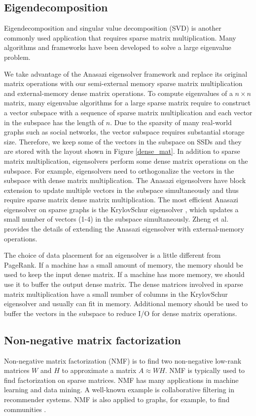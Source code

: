 \subsection{Eigendecomposition}
Eigendecomposition and singular value decomposition (SVD) is another commonly
used application that requires sparse matrix multiplication. Many
algorithms \cite{Lanczos, IRLM, krylovschur} and frameworks
\cite{arpack, anasazi, slepc} have been developed to solve a large eigenvalue
problem.

We take advantage of the Anasazi eigensolver framework \cite{anasazi} and
replace its original matrix operations with our semi-external memory sparse
matrix multiplication and external-memory dense matrix operations. To compute
eigenvalues of a $n \times n$ matrix, many eigenvalue algorithms for a large
sparse matrix require to construct a vector subspace with a sequence of
sparse matrix multiplication and each vector in the subspace has the length of $n$.
Due to the sparsity of many real-world graphs such as social networks,
the vector subspace requires substantial storage size. Therefore, we keep
some of the vectors in the subspace on SSDs and they are stored with the layout
shown in Figure \ref{dense_mat}. In addition to sparse matrix
multiplication, eigensolvers perform some dense matrix operations on the subspace.
For example, eigensolvers need to orthogonalize the vectors in the subspace with
dense matrix multiplication. The Anasazi eigensolvers have block extension to
update multiple
vectors in the subspace simultaneously and thus require sparse matrix dense
matrix multiplication. The most efficient Anasazi eigensolver on sparse graphs
is the KrylovSchur eigensolver \cite{krylovschur}, which updates a small number
of vectors (1-4) in the subspace simultaneously. Zheng et al.
\cite{flasheigen} provides the details of extending the Anasazi eigensolver
with external-memory operations.

The choice of data placement for an eigensolver is a little different from
PageRank. If a machine has a small amount of memory, the memory should be
used to keep the input dense matrix. If a machine has more memory, we should
use it to buffer the output dense matrix. The dense matrices involved in
sparse matrix multiplication have a small number of columns in
the KrylovSchur eigensolver and usually can fit in memory. 
Additional memory should be used to buffer the vectors in the subspace
to reduce I/O for dense matrix operations.

\subsection{Non-negative matrix factorization}
Non-negative matrix factorization (NMF) \cite{nmf} is to find two non-negative
low-rank matrices $W$ and $H$ to approximate a matrix $A \approx WH$. NMF is
typically used to find factorization on sparse matrices. NMF has many applications
in machine learning
and data mining. A well-known example is collaborative filtering \cite{cf} in
recommender systems. NMF is also applied to graphs, for example, to find communities
\cite{yang13, wang11}.

